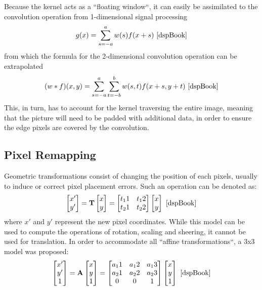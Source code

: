 Because the kernel acts as a ``floating window``, it can easily be assimilated to the convolution operation
from 1-dimensional signal processing \[g(x) = \sum_{s=-a}^{a} w(s)f(x+s) \text{ \cite{dspBook}}\] from which
the formula for the 2-dimensional convolution operation can be extrapolated \[(w*f)(x, y) = \sum_{s=-a}^{a}
	\sum_{t=-b}^{b} w(s, t)f(x + s, y + t)\text{ \cite{dspBook}}\] This, in turn, has to account for the kernel
traversing the entire image, meaning that the picture will need to be padded with additional data, in order to
ensure the edge pixels are covered by the convolution.

\subsection{Pixel Remapping}

Geometric transformations consist of changing the position of each pixels, usually to induce or correct pixel
placement errors. Such an operation can be denoted as:
\[
	\begin{bmatrix}
		x' \\
		y' \\
	\end{bmatrix}
	=
	\mathbf{T}
	\begin{bmatrix}
		x \\
		y \\
	\end{bmatrix}
	=
	\begin{bmatrix}
		t_11 & t_12 \\
		t_21 & t_22 \\
	\end{bmatrix}
	\begin{bmatrix}
		x \\
		y \\
	\end{bmatrix}
	\text{ \cite{dspBook}}
\]
where \(x'\) and \(y'\) represent the new pixel coordinates. While this model can be used to compute the
operations of rotation, scaling and sheering, it cannot be used for translation. In order to accommodate
all ``affine transformations``, a 3x3 model was proposed:
\[
	\begin{bmatrix}
		x' \\
		y' \\
		1  \\
	\end{bmatrix}
	=
	\mathbf{A}
	\begin{bmatrix}
		x \\
		y \\
		1 \\
	\end{bmatrix}
	=
	\begin{bmatrix}
		a_11 & a_12 & a_13 \\
		a_21 & a_22 & a_23 \\
		0    & 0    & 1    \\
	\end{bmatrix}
	\begin{bmatrix}
		x \\
		y \\
		1 \\
	\end{bmatrix}
	\text{ \cite{dspBook}}
\]


